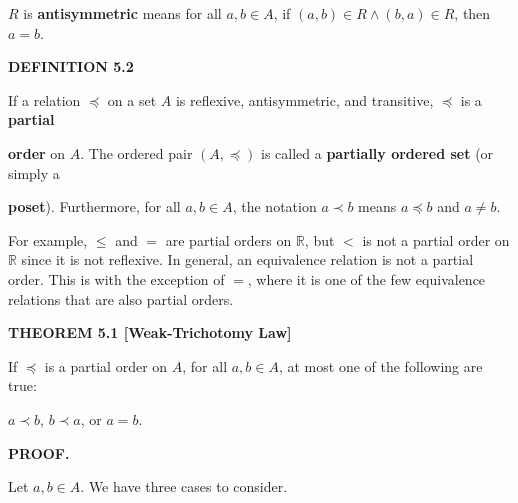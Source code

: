 \documentclass[12pt, a4paper]{article}
\begin{document}
\vspace{4mm}

\hspace{5mm} $R$ is \textbf{antisymmetric} means for all $a,b\in A$, if $(a,b)\in R\wedge(b,a)\in R$, then $a=b$.

\vspace{4mm}

\noindent\blacksquare\textbf{ DEFINITION 5.2}\par

\vspace{4mm}

If a relation $\preceq$ on a set $A$ is reflexive, antisymmetric, and transitive, $\preceq$ is a \textbf{partial}\par \textbf{order} on $A$. The ordered pair $(A,\preceq)$ is called a \textbf{partially ordered set} (or simply a\par \textbf{poset}). Furthermore, for all $a,b\in A$, the notation $a\prec b$ means $a\preceq b$ and $a\neq b$.\par

\vspace{4mm}

\noindent For example, $\leq$ and $=$ are partial orders on $\mathbb{R}$, but $<$ is not a partial order on $\mathbb{R}$ since it is not reflexive. In general, an equivalence relation is not a partial order. This is with the exception of $=$, where it is one of the few equivalence relations that are also partial orders.\par

\vspace{4mm}

\noindent\blacksquare\textbf{ THEOREM 5.1 [Weak-Trichotomy Law]}\par

\vspace{4mm}

If $\preceq$ is a partial order on $A$, for all $a,b\in A$, at most one of the following are true:\par

$a\prec b$, $b\prec a$, or $a=b$.\par

\vspace{4mm}

\noindent\textbf{PROOF.}\par

Let $a,b\in A$. We have three cases to consider.\par
\end{document}
